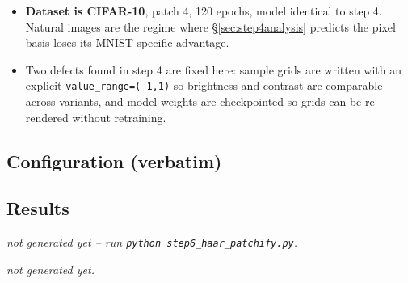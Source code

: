 \documentclass[11pt]{article}
\begin{document}
\begin{itemize}
        domain, \texttt{Hf} = Haar domain reversed:
        \texttt{baseline\_flip} = [I,F,I,F] (official),
        \texttt{haar\_alt} = [H,I,H,F] (one Haar round then one pixel round in
        the opposite order), \texttt{haar\_pure} = [H,Hf,H,Hf] (control: every
        block in the Haar domain, direction alternated for balanced coverage).
  \item \textbf{Dataset is CIFAR-10}, patch 4, 120 epochs, model identical to
        step 4. Natural images are the regime where \S\ref{sec:step4analysis}
        predicts the pixel basis loses its MNIST-specific advantage.
  \item Two defects found in step 4 are fixed here: sample grids are written
        with an explicit \texttt{value\_range=(-1,1)} so brightness and
        contrast are comparable across variants, and model weights are
        checkpointed so grids can be re-rendered without retraining.
\end{itemize}

\subsection{Configuration (verbatim)}
{\small}

\subsection{Results}
\begin{center}
  {\emph{not generated yet -- run \texttt{python step6\_haar\_patchify.py}.}}
\end{center}

  {\emph{not generated yet.}}
\clearpage
\end{document}
